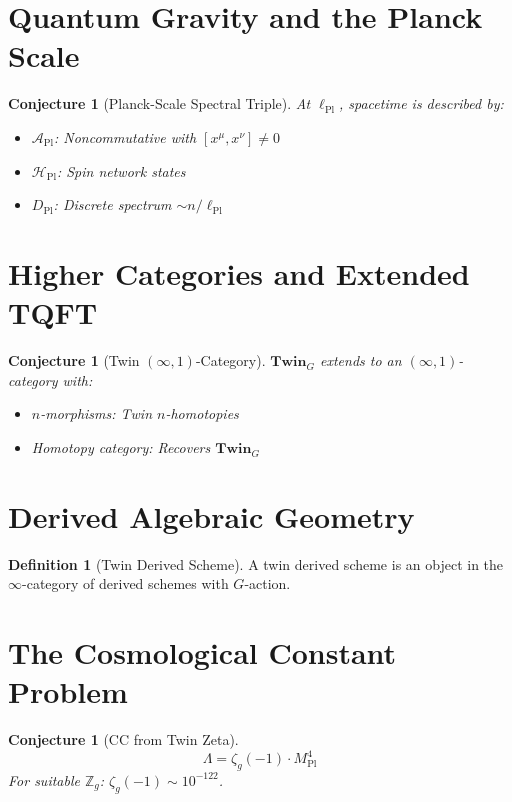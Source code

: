 \documentclass[11pt,a4paper,openright]{book}
\theoremstyle{plain}
\newtheorem{conjecture}[theorem]{Conjecture}
\theoremstyle{definition}
\newtheorem{definition}[theorem]{Definition}
\newcommand{\Hil}{\mathcal{H}}
\newcommand{\A}{\mathcal{A}}
\newcommand{\Pl}{\mathrm{Pl}}
\newcommand{\Z}{\mathbb{Z}}
\newcommand{\Twin}{\mathbf{Twin}}
\newcommand{\ellPl}{\ell_{\mathrm{Pl}}}
\newcommand{\MPl}{M_{\mathrm{Pl}}}
\newcommand{\Lam}{\Lambda}
\begin{document}
\section{Quantum Gravity and the Planck Scale}

\begin{conjecture}[Planck-Scale Spectral Triple]
At $\ellPl$, spacetime is described by:
\begin{itemize}
    \item $\A_{\Pl}$: Noncommutative with $[x^\mu, x^\nu] \neq 0$
    \item $\Hil_{\Pl}$: Spin network states
    \item $D_{\Pl}$: Discrete spectrum $\sim n/\ellPl$
\end{itemize}
\end{conjecture}

\section{Higher Categories and Extended TQFT}

\begin{conjecture}[Twin $(\infty, 1)$-Category]
$\Twin_G$ extends to an $(\infty, 1)$-category with:
\begin{itemize}
    \item $n$-morphisms: Twin $n$-homotopies
    \item Homotopy category: Recovers $\Twin_G$
\end{itemize}
\end{conjecture}

\section{Derived Algebraic Geometry}

\begin{definition}[Twin Derived Scheme]
A twin derived scheme is an object in the $\infty$-category of derived schemes with $G$-action.
\end{definition}

\section{The Cosmological Constant Problem}

\begin{conjecture}[CC from Twin Zeta]
\begin{equation}
\Lam = \zeta_g(-1) \cdot \MPl^4
\end{equation}
For suitable $\Z_g$: $\zeta_g(-1) \sim 10^{-122}$.
\end{conjecture}
\end{document}
